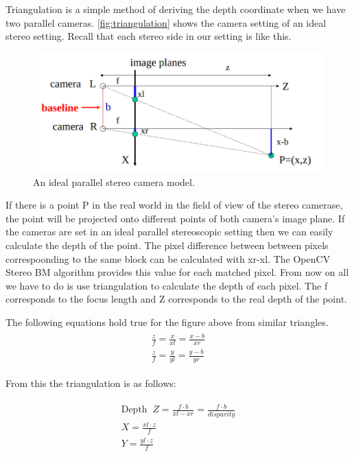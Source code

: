 Triangulation is a simple method of deriving the depth coordinate when we have
two parallel cameras. \autoref{fig:triangulation} shows the camera setting of
an ideal stereo setting. Recall that each stereo side in our setting is like
this.

\begin{figure}[!ht]
    \centering
    \includegraphics[width=150mm, keepaspectratio]{figures/triangulation.png}
    \caption{An ideal parallel stereo camera model.}
    \label{fig:triangulation}
\end{figure}

If there is a point P in the real world in the field of view of the stereo
camerase, the point will be projected onto different points of both camera's
image plane. If the cameras are set in an ideal parallel stereoscopic setting
then we can easily calculate the depth of the point. The pixel difference
between between pixels correspoonding to the same block can be calculated with
xr-xl. The OpenCV Stereo BM algorithm provides this value for each matched
pixel. From now on all we have to do is use triangulation to calculate the depth
of each pixel. The f corresponds to the focus length and Z corresponds to the
real depth of the point.

The following equations hold true for the figure above from similar triangles.
\begin{align}
    \begin{split}
        \frac{z}{f} = \frac{x}{xl} =  \frac{x-b}{xr} \\
        \frac{z}{f} = \frac{y}{yl} =  \frac{y-b}{yr}
    \end{split}
\end{align}

From this the triangulation is as follows:

\begin{align}
    \begin{split}
        \text{Depth}\;\; Z = \frac{f \cdot b}{xl - xr} =  \frac{f \cdot b}{disparity} \\
        X = \frac{xl \cdot z}{f} \\
        Y = \frac{yl \cdot z}{f}
    \end{split}
\end{align}


